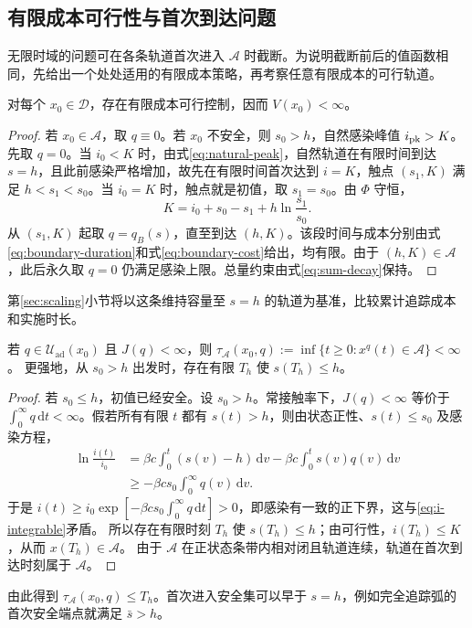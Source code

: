 \documentclass[lang=cn,a4paper,newtx]{elegantpaper}
\theoremstyle{plain}
\theoremstyle{definition}
\newcommand{\Acal}{\mathcal A}
\newcommand{\Dcal}{\mathcal D}
\newcommand{\Uad}{\mathcal U_{\mathrm{ad}}}
\newcommand{\dd}{\,\mathrm d}
\begin{document}
\subsection{有限成本可行性与首次到达问题}
\label{sec:exit-time}
无限时域的问题可在各条轨道首次进入 $\Acal$ 时截断。为说明截断前后的值函数相同，先给出一个处处适用的有限成本策略，再考察任意有限成本的可行轨道。

\begin{lemma}[维持容量至 $s=h$ 的可行策略]
\label{lem:finite-feasible}
对每个 $x_0\in\Dcal$，存在有限成本可行控制，因而 $V(x_0)<\infty$。
\end{lemma}
\begin{proof}
若 $x_0\in\Acal$，取 $q\equiv0$。若 $x_0$ 不安全，则 $s_0>h$，自然感染峰值 $i_{\rm pk}>K$。先取 $q=0$。当 $i_0<K$ 时，由式\eqref{eq:natural-peak}，自然轨道在有限时间到达 $s=h$，且此前感染严格增加，故先在有限时间首次达到 $i=K$，触点 $(s_1,K)$ 满足 $h<s_1<s_0$。当 $i_0=K$ 时，触点就是初值，取 $s_1=s_0$。由 $\Phi$ 守恒，
\begin{equation}
K=i_0+s_0-s_1+h\ln\frac{s_1}{s_0}.
\label{eq:s1}
\end{equation}
从 $(s_1,K)$ 起取 $q=q_B(s)$，直至到达 $(h,K)$。该段时间与成本分别由式\eqref{eq:boundary-duration}和式\eqref{eq:boundary-cost}给出，均有限。由于 $(h,K)\in\Acal$，此后永久取 $q=0$ 仍满足感染上限。总量约束由式\eqref{eq:sum-decay}保持。
\end{proof}
第\ref{sec:scaling}小节将以这条维持容量至 $s=h$ 的轨道为基准，比较累计追踪成本和实施时长。

\begin{lemma}[所有有限成本轨道均在有限时间进入安全集]
\label{lem:finite-entry}
若 $q\in\Uad(x_0)$ 且 $J(q)<\infty$，则
$\tau_{\Acal}(x_0,q):=\inf\{t\ge0:x^q(t)\in\Acal\}<\infty$。
更强地，从 $s_0>h$ 出发时，存在有限 $T_h$ 使 $s(T_h)\le h$。
\end{lemma}
\begin{proof}
若 $s_0\le h$，初值已经安全。设 $s_0>h$。常接触率下，$J(q)<\infty$ 等价于 $\int_0^\infty q\dd t<\infty$。假若所有有限 $t$ 都有 $s(t)>h$，则由状态正性、$s(t)\le s_0$ 及感染方程，
\begin{align*}
\ln\frac{i(t)}{i_0}
&=\beta c\int_0^t(s(v)-h)\dd v-\beta c\int_0^t s(v)q(v)\dd v\\
&\ge-\beta cs_0\int_0^\infty q(v)\dd v.
\end{align*}
于是 $i(t)\ge i_0\exp[-\beta cs_0\int_0^\infty q\dd t]>0$，即感染有一致的正下界，这与\eqref{eq:i-integrable}矛盾。
所以存在有限时刻 $T_h$ 使 $s(T_h)\le h$；由可行性，$i(T_h)\le K$，从而 $x(T_h)\in\Acal$。
由于 $\Acal$ 在正状态条带内相对闭且轨道连续，轨道在首次到达时刻属于 $\Acal$。
\end{proof}
由此得到 $\tau_{\Acal}(x_0,q)\le T_h$。首次进入安全集可以早于 $s=h$，例如完全追踪弧的首次安全端点就满足 $\bar s>h$。
\end{document}
